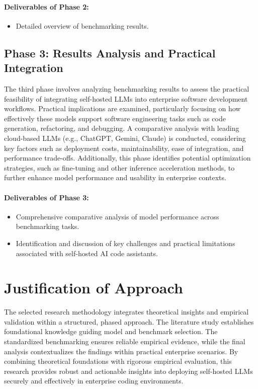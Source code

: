\paragraph{Deliverables of Phase 2:}

\begin{itemize}
	\item Detailed overview of benchmarking results.
\end{itemize}

\subsection{Phase 3: Results Analysis and Practical Integration}

The third phase involves analyzing benchmarking results to assess the practical feasibility of integrating self-hosted LLMs into enterprise software development workflows. Practical implications are examined, particularly focusing on how effectively these models support software engineering tasks such as code generation, refactoring, and debugging.
A comparative analysis with leading cloud-based LLMs (e.g., ChatGPT, Gemini, Claude) is conducted, considering key factors such as deployment costs, maintainability, ease of integration, and performance trade-offs.
Additionally, this phase identifies potential optimization strategies, such as fine-tuning and other inference acceleration methods, to further enhance model performance and usability in enterprise contexts.

\paragraph{Deliverables of Phase 3:}

\begin{itemize}
	\item Comprehensive comparative analysis of model performance across benchmarking tasks.
	\item Identification and discussion of key challenges and practical limitations associated with self-hosted AI code assistants.
\end{itemize}

\section{Justification of Approach}
\label{sec:justification-of-approach}

The selected research methodology integrates theoretical insights and empirical validation within a structured, phased approach. The literature study establishes foundational knowledge guiding model and benchmark selection. The standardized benchmarking ensures reliable empirical evidence, while the final analysis contextualizes the findings within practical enterprise scenarios.
By combining theoretical foundations with rigorous empirical evaluation, this research provides robust and actionable insights into deploying self-hosted LLMs securely and effectively in enterprise coding environments.

